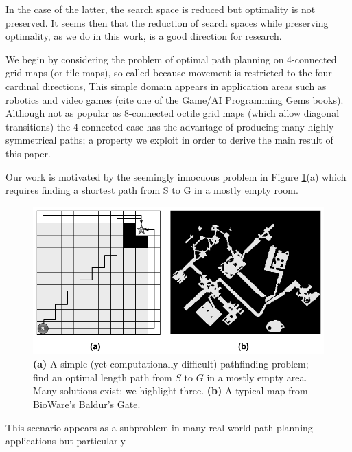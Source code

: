 In the case of the latter, the search space is reduced but optimality is not preserved. 
It seems then that the reduction of search spaces while preserving optimality, as we do in this work, is a good direction for research.
\par
We begin by considering the problem of optimal path planning on 4-connected grid maps (or tile maps),
so called because movement is restricted to the four cardinal directions, 
This simple domain appears in application areas such as robotics \cite{latombe91} and video games 
(cite one of the Game/AI Programming Gems books).
Although not as popular as 8-connected octile grid maps (which allow diagonal transitions) the 4-connected case has 
the advantage of producing many highly symmetrical paths; 
a property we exploit in order to derive the main result of this paper.
\par 
Our work is motivated by the seemingly innocuous problem in Figure \ref{fig-emptymap}(a)
which requires finding a shortest path from S to G in a mostly empty room.
\begin{figure}[htbp]
	\vspace{-4pt}
       \begin{center}
                       \includegraphics[scale=0.30, trim = 20mm 20mm 20mm 0mm]{diagrams/emptymap.png}
       \end{center}
	\vspace{-3pt}
       \caption{\textbf{(a)} A simple (yet computationally difficult) pathfinding problem; find an 
optimal length path from $S$ to $G$ in a mostly empty area. 
Many solutions exist; we highlight three. 
\textbf{(b)} A typical map from BioWare's Baldur's Gate.}
       \label{fig-emptymap}
	\vspace{-12pt}
\end{figure}
This scenario appears as a subproblem in many real-world path planning applications but particularly
